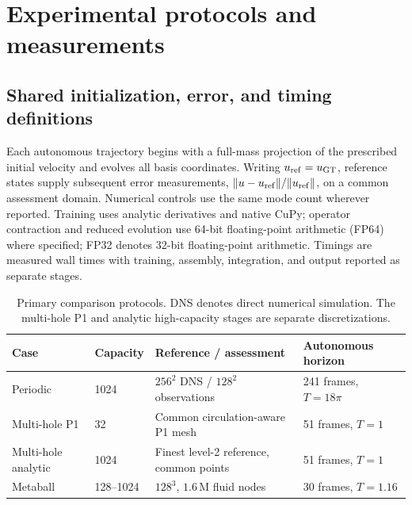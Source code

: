 \section{Experimental protocols and measurements}
\label{app:protocol}
\subsection{Shared initialization, error, and timing definitions}
Each autonomous trajectory begins with a full-mass projection of the prescribed initial velocity and evolves all basis coordinates. Writing $u_{\rm ref}=u_{\rm GT}$, reference states supply subsequent error measurements, $\lVert u-u_{\rm ref}\rVert/\lVert u_{\rm ref}\rVert$, on a common assessment domain. Numerical controls use the same mode count wherever reported. Training uses analytic derivatives and native CuPy; operator contraction and reduced evolution use 64-bit floating-point arithmetic (FP64) where specified; FP32 denotes 32-bit floating-point arithmetic. Timings are measured wall times with training, assembly, integration, and output reported as separate stages.

\begin{table}[!htb]
\centering\small
\caption{Primary comparison protocols. DNS denotes direct numerical simulation. The multi-hole P1 and analytic high-capacity stages are separate discretizations.}
\begin{tabular}{llll}\toprule
Case & Capacity & Reference / assessment & Autonomous horizon\\\midrule
Periodic &1024&$256^2$ DNS / $128^2$ observations&241 frames, $T=18\pi$\\
Multi-hole P1 &32&Common circulation-aware P1 mesh&51 frames, $T=1$\\
Multi-hole analytic &1024&Finest level-2 reference, common points&51 frames, $T=1$\\
Metaball &128--1024&$128^3$, $1.6\,\mathrm{M}$ fluid nodes&30 frames, $T=1.16$\\\bottomrule
\end{tabular}
\end{table}

